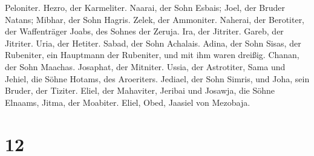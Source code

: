 Peloniter.  Hezro, der Karmeliter. Naarai, der Sohn
Esbais;  Joel, der Bruder Natans; Mibhar, der Sohn
Hagris.  Zelek, der Ammoniter. Naherai, der Berotiter,
der Waffenträger Joabs, des Sohnes der Zeruja.  Ira, der
Jitriter. Gareb, der Jitriter.  Uria, der Hetiter. Sabad,
der Sohn Achalais.  Adina, der Sohn Sisas, der Rubeniter,
ein Hauptmann der Rubeniter, und mit ihm waren dreißig. 
Chanan, der Sohn Maachas. Josaphat, der Mitniter.  Ussia,
der Astrotiter, Sama und Jehiel, die Söhne Hotams, des Aroeriters.
 Jediael, der Sohn Simris, und Joha, sein Bruder, der
Tiziter.  Eliel, der Mahaviter, Jeribai und Josawja, die
Söhne Elnaams, Jitma, der Moabiter.  Eliel, Obed, Jaasiel
von Mezobaja.

\hypertarget{section-11}{%
\section{12}\label{section-11}}


